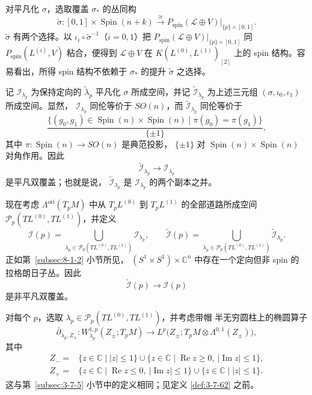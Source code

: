 对平凡化 $\sigma$，选取覆盖 $\sigma_*$ 的丛同构
\[
 \widetilde\sigma\colon
 [0,1]\times\operatorname{Spin}(n+k)
 \xrightarrow{\ \cong\ }
 P_{\mathrm{spin}}(\mathcal L\oplus V)
 \big|_{\{p\}\times[0,1]}.
\]
$\widetilde\sigma$ 有两个选择。以
$\iota_i\circ\widetilde\sigma^{-1}$（$i=0,1$）把
$P_{\mathrm{spin}}(\mathcal L\oplus V)|_{\{p\}\times[0,1]}$
同 $P_{\mathrm{spin}}(L^{(i)},V)$ 粘合，便得到
$\mathcal L\oplus V$ 在 $K(L^{(0)},L^{(1)})_{[2]}$ 上的
spin 结构。容易看出，所得 spin 结构不依赖于 $\sigma_*$ 的提升
$\widetilde\sigma$ 之选择。

记 $\mathcal I_{\lambda_p}$ 为保持定向的
$\widetilde\lambda_p$ 平凡化 $\sigma$ 所成空间，并记
$\widetilde{\mathcal I}_{\lambda_p}$ 为上述三元组
$(\sigma,\iota_0,\iota_1)$ 所成空间。显然，
$\mathcal I_{\lambda_p}$ 同伦等价于 $SO(n)$，而
$\widetilde{\mathcal I}_{\lambda_p}$ 同伦等价于
\[
 \frac{
 \{(g_0,g_1)\in\operatorname{Spin}(n)\times\operatorname{Spin}(n)
 \mid \pi(g_0)=\pi(g_1)\}}
 {\{\pm1\}},
\]
其中 $\pi\colon\operatorname{Spin}(n)\to SO(n)$ 是典范投影，
$\{\pm1\}$ 对 $\operatorname{Spin}(n)\times\operatorname{Spin}(n)$
对角作用。因此
\[
 \widetilde{\mathcal I}_{\lambda_p}\longrightarrow
 \mathcal I_{\lambda_p}
\]
是平凡双覆盖；也就是说，
$\widetilde{\mathcal I}_{\lambda_p}$ 是
$\mathcal I_{\lambda_p}$ 的两个副本之并。

现在考虑 $\Lambda^{\mathrm{ori}}(T_pM)$ 中从 $T_pL^{(0)}$
到 $T_pL^{(1)}$ 的全部道路所成空间
$\mathcal P_p(TL^{(0)},TL^{(1)})$，并定义
\[
 \mathcal I(p)=
 \bigcup_{\lambda_p\in\mathcal P_p(TL^{(0)},TL^{(1)})}
 \mathcal I_{\lambda_p},
 \qquad
 \widetilde{\mathcal I}(p)=
 \bigcup_{\lambda_p\in\mathcal P_p(TL^{(0)},TL^{(1)})}
 \widetilde{\mathcal I}_{\lambda_p}.
\]
正如第~\ref{subsec:8-1-2} 小节所见，
$(S^1\times S^1)\times\mathbb C^n$ 中存在一个定向但非 spin 的
拉格朗日子丛。因此
\[
 \widetilde{\mathcal I}(p)\longrightarrow\mathcal I(p)
\]
是非平凡双覆盖。

对每个 $p$，选取
$\lambda_p\in\mathcal P_p(TL^{(0)},TL^{(1)})$，并考虑带帽
半无穷圆柱上的椭圆算子
\[
 \bar\partial_{\lambda_p,Z_\pm}\colon
 W_{\lambda_p}^{1,p}(Z_\pm;T_pM)
 \longrightarrow
 L^p\bigl(Z_\pm;T_pM\otimes\Lambda^{0,1}(Z_\pm)\bigr),
\]
其中
\[
\begin{aligned}
 Z_-={}&\{z\in\mathbb C\mid |z|\leq1\}
 \cup\{z\in\mathbb C\mid\operatorname{Re}z\geq0,\
       |\operatorname{Im}z|\leq1\},\\
 Z_+={}&\{z\in\mathbb C\mid\operatorname{Re}z\leq0,\
       |\operatorname{Im}z|\leq1\}
 \cup\{z\in\mathbb C\mid |z|\leq1\}.
\end{aligned}
\]
这与第~\ref{subsec:3-7-5} 小节中的定义相同；见定义
\ref{def:3-7-62} 之前。

